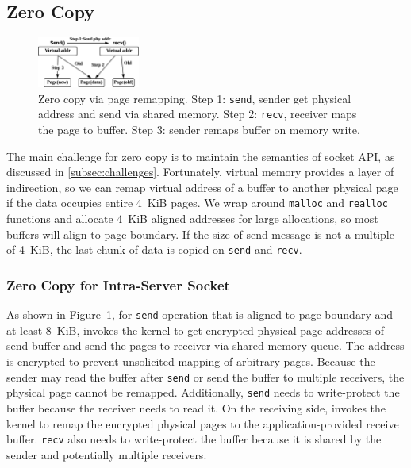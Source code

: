 \subsection{Zero Copy}
\label{subsec:zerocopy}

\begin{figure}[t]
	\centering
	\includegraphics[width=0.3\textwidth]{images/zerocopy}
	\caption{Zero copy via page remapping. Step 1: \texttt{send}, sender get physical address and send via shared memory. Step 2: \texttt{recv}, receiver maps the page to buffer. Step 3: sender remaps buffer on memory write.}
	\vspace{-15pt}
	\label{fig:zerocopy}
\end{figure}

The main challenge for zero copy is to maintain the semantics of socket API, as discussed in \ref{subsec:challenges}.
Fortunately, virtual memory provides a layer of indirection, so we can remap virtual address of a buffer to another physical page if the data occupies entire 4~KiB pages.
We wrap around \texttt{malloc} and \texttt{realloc} functions and allocate 4~KiB aligned addresses for large allocations, so most buffers will align to page boundary.
If the size of send message is not a multiple of 4~KiB, the last chunk of data is copied on \texttt{send} and \texttt{recv}.

\subsubsection{Zero Copy for Intra-Server Socket}
\label{subsec:zero-copy-intra}

As shown in Figure~\ref{fig:zerocopy}, for \texttt{send} operation that is aligned to page boundary and at least 8~KiB, \libipc{} invokes the kernel to get encrypted physical page addresses of send buffer and send the pages to receiver via shared memory queue.
The address is encrypted to prevent unsolicited mapping of arbitrary pages.
Because the sender may read the buffer after \texttt{send} or send the buffer to multiple receivers, the physical page cannot be remapped.
Additionally, \texttt{send} needs to write-protect the buffer because the receiver needs to read it.
On the receiving side, \libipc{} invokes the kernel to remap the encrypted physical pages to the application-provided receive buffer.
\texttt{recv} also needs to write-protect the buffer because it is shared by the sender and potentially multiple receivers.

